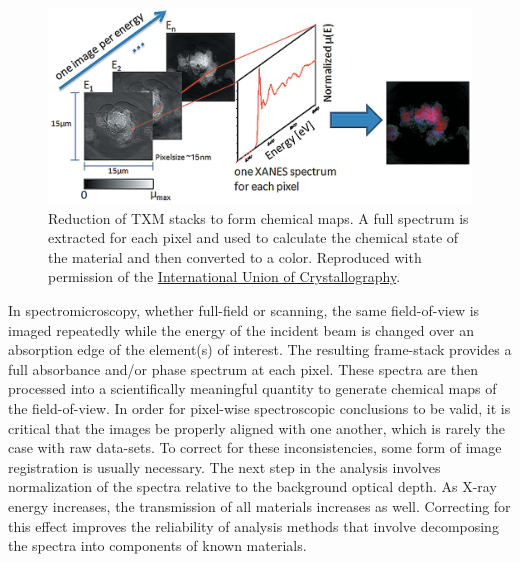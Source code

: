 \documentclass[journal=cmatex,manuscript=perspective]{achemso}
\newcommand{\iucr}{Reproduced with permission of the
  \href{http://journals.iucr.org/}{International Union of
    Crystallography}.}
\begin{document}
\begin{figure}
  \includegraphics[width=\textwidth]{meirer2011-2.png}
  \caption{Reduction of TXM stacks to form chemical maps. A full
    spectrum is extracted for each pixel and used to calculate the
    chemical state of the material and then converted to a
    color.\cite{meirer2011} \iucr}
  \label{figure:meirer2011-2}
\end{figure}

In spectromicroscopy, whether full-field or scanning, the same
field-of-view is imaged repeatedly while the energy of the incident
beam is changed over an absorption edge of the element(s) of
interest. The resulting frame-stack provides a full absorbance and/or
phase spectrum at each pixel. These spectra are then processed into a
scientifically meaningful quantity to generate chemical maps of the
field-of-view. In order for pixel-wise spectroscopic conclusions to be
valid, it is critical that the images be properly aligned with one
another, which is rarely the case with raw data-sets. To correct for
these inconsistencies, some form of image registration is usually
necessary. The next step in the analysis involves normalization of the
spectra relative to the background optical depth. As X-ray energy
increases, the transmission of all materials increases as
well. Correcting for this effect improves the reliability of analysis
methods that involve decomposing the spectra into components of known
materials\cite{jin2015}.
\end{document}
